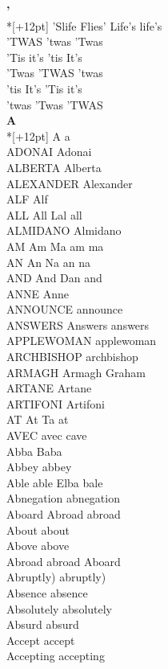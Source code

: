 
\vspace{14pt}
\noindent\textbf{\Large '}\\*[+12pt]
'Slife Flies' Life's life's\\
'TWAS 'twas 'Twas\\
'Tis it's 'tis It's\\
'Twas 'TWAS 'twas\\
'tis It's 'Tis it's\\
'twas 'Twas 'TWAS\\

\vspace{14pt}
\noindent\textbf{\Large A}\\*[+12pt]
A a\\
ADONAI Adonai\\
ALBERTA Alberta\\
ALEXANDER Alexander\\
ALF Alf\\
ALL All Lal all\\
ALMIDANO Almidano\\
AM Am Ma am ma\\
AN An Na an na\\
AND And Dan and\\
ANNE Anne\\
ANNOUNCE announce\\
ANSWERS Answers answers\\
APPLEWOMAN applewoman\\
ARCHBISHOP archbishop\\
ARMAGH Armagh Graham\\
ARTANE Artane\\
ARTIFONI Artifoni\\
AT At Ta at\\
AVEC avec cave\\
Abba Baba\\
Abbey abbey\\
Able able Elba bale\\
Abnegation abnegation\\
Aboard Abroad abroad\\
About about\\
Above above\\
Abroad abroad Aboard\\
Abruptly) abruptly)\\
Absence absence\\
Absolutely absolutely\\
Absurd absurd\\
Accept accept\\
Accepting accepting\\
